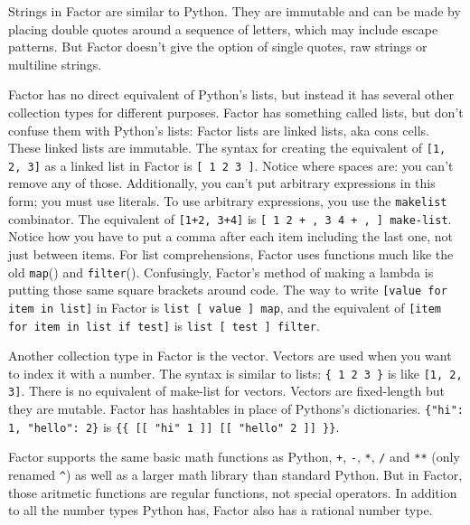 \documentclass{article}
\begin{document}
Strings in Factor are similar to Python. They are immutable and can be made by placing double quotes around a sequence of letters, which may include escape patterns. But Factor doesn't give the option of single quotes, raw strings or multiline strings.

Factor has no direct equivalent of Python's lists, but instead it has several other collection types for different purposes. Factor has something called lists, but don't confuse them with Python's lists: Factor lists are linked lists, aka cons cells. These linked lists are immutable. The syntax for creating the equivalent of \verb|[1, 2, 3]| as a linked list in Factor is \verb|[ 1 2 3 ]|. Notice where spaces are: you can't remove any of those. Additionally, you can't put arbitrary expressions in this form; you must use literals. To use arbitrary expressions, you use the \texttt{makelist} combinator. The equivalent of \verb|[1+2, 3+4]| is \verb|[ 1 2 + , 3 4 + , ] make-list|. Notice how you have to put a comma after each item including the last one, not just between items. For list comprehensions, Factor uses functions much like the old \texttt{map}() and \texttt{filter}(). Confusingly, Factor's method of making a lambda is putting those same square brackets around code. The way to write \verb|[value for item in list]| in Factor is \verb|list [ value ] map|, and the equivalent of \verb|[item for item in list if test]| is \verb|list [ test ] filter|.

Another collection type in Factor is the vector. Vectors are used when you want to index it with a number. The syntax is similar to lists: \verb|{ 1 2 3 }| is like \verb|[1, 2, 3]|. There is no equivalent of make-list for vectors. Vectors are fixed-length but they are mutable. Factor has hashtables in place of Pythons's dictionaries. \verb|{"hi": 1, "hello": 2}| is \verb|{{ [[ "hi" 1 ]] [[ "hello" 2 ]] }}|.

Factor supports the same basic math functions as Python, \texttt{+}, \texttt{-}, \texttt{*}, \texttt{/} and \texttt{**} (only renamed \texttt{^}) as well as a larger math library than standard Python. But in Factor, those aritmetic functions are regular functions, not special operators. In addition to all the number types Python has, Factor also has a rational number type.
\end{document}

